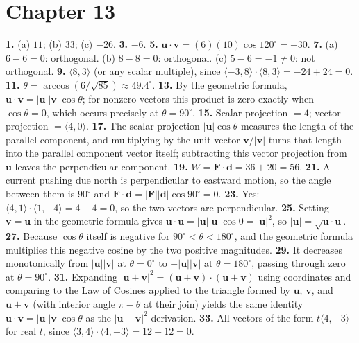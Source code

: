 \section*{Chapter 13}
\textbf{1.} (a) $11$; (b) $33$; (c) $-26$. \quad
\textbf{3.} $-6$. \quad
\textbf{5.} $\mathbf{u}\cdot\mathbf{v} = (6)(10)\cos120^\circ = -30$.
\quad
\textbf{7.} (a) $6-6=0$: orthogonal. (b) $8-8=0$: orthogonal. (c)
$5-6=-1 \neq 0$: not orthogonal. \quad
\textbf{9.} $\langle 8,3 \rangle$ (or any scalar multiple), since
$\langle -3,8\rangle \cdot \langle 8,3\rangle = -24+24=0$. \quad
\textbf{11.} $\theta = \arccos(6/\sqrt{85}) \approx 49.4^\circ$. \quad
\textbf{13.} By the geometric formula, $\mathbf{u}\cdot\mathbf{v} =
|\mathbf{u}||\mathbf{v}|\cos\theta$; for nonzero vectors this product is
zero exactly when $\cos\theta=0$, which occurs precisely at
$\theta=90^\circ$. \quad
\textbf{15.} Scalar projection $=4$; vector projection $=\langle
4,0\rangle$. \quad
\textbf{17.} The scalar projection $|\mathbf{u}|\cos\theta$ measures the
length of the parallel component, and multiplying by the unit vector
$\mathbf{v}/|\mathbf{v}|$ turns that length into the parallel component
vector itself; subtracting this vector projection from $\mathbf{u}$
leaves the perpendicular component. \quad
\textbf{19.} $W = \mathbf{F}\cdot\mathbf{d} = 36+20 = 56$. \quad
\textbf{21.} A current pushing due north is perpendicular to eastward
motion, so the angle between them is $90^\circ$ and
$\mathbf{F}\cdot\mathbf{d} = |\mathbf{F}||\mathbf{d}|\cos90^\circ = 0$.
\quad
\textbf{23.} Yes: $\langle4,1\rangle\cdot\langle1,-4\rangle = 4-4=0$, so
the two vectors are perpendicular. \quad
\textbf{25.} Setting $\mathbf{v}=\mathbf{u}$ in the geometric formula
gives $\mathbf{u}\cdot\mathbf{u} = |\mathbf{u}||\mathbf{u}|\cos0 =
|\mathbf{u}|^2$, so $|\mathbf{u}| = \sqrt{\mathbf{u}\cdot\mathbf{u}}$.
\quad
\textbf{27.} Because $\cos\theta$ itself is negative for
$90^\circ<\theta<180^\circ$, and the geometric formula multiplies this
negative cosine by the two positive magnitudes. \quad
\textbf{29.} It decreases monotonically from $|\mathbf{u}||\mathbf{v}|$
at $\theta=0^\circ$ to $-|\mathbf{u}||\mathbf{v}|$ at $\theta=180^\circ$,
passing through zero at $\theta=90^\circ$. \quad
\textbf{31.} Expanding $|\mathbf{u}+\mathbf{v}|^2 =
(\mathbf{u}+\mathbf{v})\cdot(\mathbf{u}+\mathbf{v})$ using coordinates and
comparing to the Law of Cosines applied to the triangle formed by
$\mathbf{u}$, $\mathbf{v}$, and $\mathbf{u}+\mathbf{v}$ (with interior
angle $\pi-\theta$ at their join) yields the same identity
$\mathbf{u}\cdot\mathbf{v}=|\mathbf{u}||\mathbf{v}|\cos\theta$ as the
$|\mathbf{u}-\mathbf{v}|^2$ derivation. \quad
\textbf{33.} All vectors of the form $t\langle4,-3\rangle$ for real $t$,
since $\langle3,4\rangle\cdot\langle4,-3\rangle = 12-12=0$.


